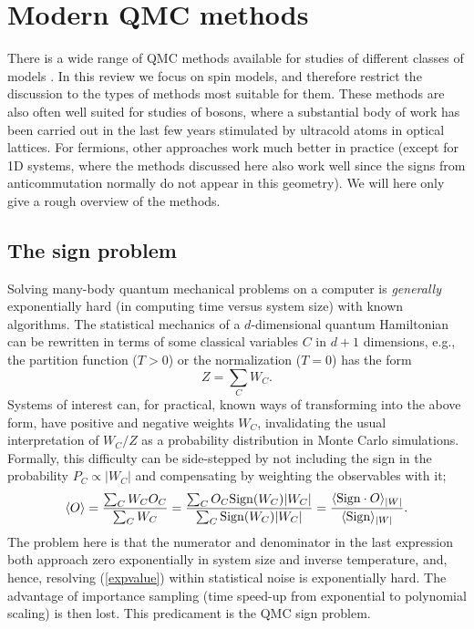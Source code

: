 \documentclass[range]{ar2e}
\begin{document}
\section{Modern QMC methods}
\label{sec:methods}

There is a wide range of QMC methods available for studies of different classes of models \cite{Assaad07,Evertz03,Sandvik10b}. In this review we 
focus on spin models, and therefore restrict the discussion to the types of methods most suitable for them. These methods are also often well suited 
for studies of bosons, where a substantial body of work has been carried out in the last few years stimulated by ultracold atoms in optical lattices. 
For fermions, other approaches work much better in practice (except for 1D systems, where the methods discussed here also work well since the 
signs from anticommutation normally do not appear in this geometry). We will here only give a rough overview of the methods.

\subsection{The sign problem}
\label{ss:sign}

Solving many-body quantum mechanical problems on a computer is {\em generally} exponentially hard (in computing time versus system size) 
with known algorithms. The statistical mechanics of a $d$-dimensional quantum Hamiltonian can be rewritten in terms of some classical variables 
$C$ in $d+1$ dimensions, e.g., the partition function ($T>0$) or the normalization ($T=0$) has the form
\begin{equation}
\label{eq:wc}
Z=\sum_C W_C.
\end{equation}
Systems of interest can, for practical, known ways of transforming into the above form, have positive and negative weights $W_C$, 
invalidating the usual interpretation of $W_C/Z$ as a probability distribution in Monte Carlo simulations. Formally, this difficulty 
can be side-stepped by not including the sign in the probability $P_C \propto |W_C|$ and compensating by weighting the observables with it;
\begin{equation}
\langle O \rangle = \frac{\sum_C W_C O_C}{\sum_C W_C} =
\frac{\sum_C O_C {\rm Sign}(W_C) |W_C|}{\sum_C {\rm Sign}(W_C)|W_C|} = 
\frac{\langle {\rm Sign} \cdot O\rangle_{|W|}}{\langle {\rm Sign}\rangle_{|W|}}.
\label{expvalue}
\end{equation}
The problem here is that the numerator and denominator in the last expression both approach zero
exponentially in system size and inverse temperature, and, hence, resolving (\ref{expvalue})
within statistical noise is exponentially hard. The advantage of importance sampling (time speed-up 
from exponential to polynomial scaling) is then lost. This predicament is the QMC sign problem.
\end{document}
